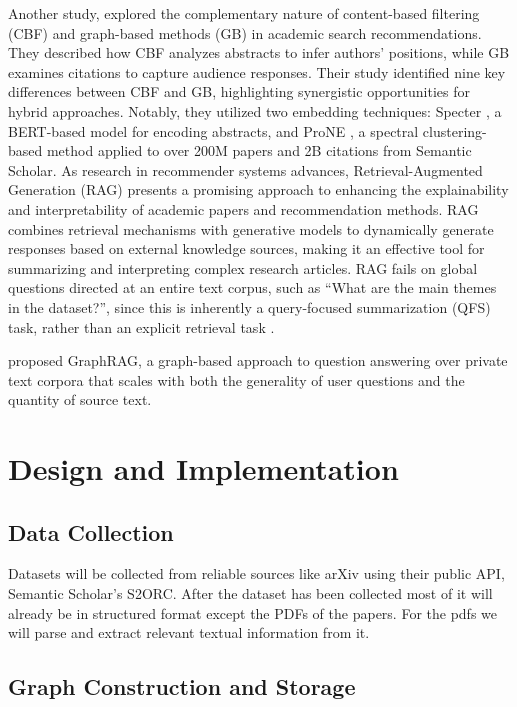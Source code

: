 \documentclass[a4paper,12pt]{article}
\begin{document}
Another study, \parencite{church2024academicarticlerecommendationusing} explored the
complementary nature of content-based filtering (CBF) and graph-based methods (GB)
in academic search recommendations. They described how CBF analyzes abstracts to
infer authors’ positions, while GB examines citations to capture audience responses.
Their study identified nine key differences between CBF and GB, highlighting
synergistic opportunities for hybrid approaches. Notably, they utilized two
embedding techniques: Specter
\parencite{cohan-etal-2020-specter}, a BERT-based model
for encoding abstracts, and ProNE \parencite{zhang2019prone}, a spectral clustering-based method applied to
over 200M papers and 2B citations from Semantic Scholar.
As research in recommender systems advances, Retrieval-Augmented Generation (RAG)
presents a promising approach to enhancing the explainability and interpretability
of academic papers and recommendation methods. RAG combines retrieval mechanisms
with generative models to dynamically generate responses based on external knowledge
sources, making it an effective tool for summarizing and interpreting complex
research articles. RAG fails on global questions directed at an entire text corpus,
such as “What are the main themes in the dataset?”, since this is inherently a
query-focused summarization (QFS) task, rather than an explicit retrieval task
\parencite{edge2025localglobalgraphrag}.

\parencite{edge2025localglobalgraphrag} proposed GraphRAG, a graph-based approach
to question answering over private text corpora that scales with both the generality
of user questions and the quantity of source text.
\newpage

\section{Design and Implementation}
\subsection{Data Collection}
Datasets will be collected from reliable sources like arXiv using their public API,
Semantic Scholar’s S2ORC. After the dataset has been collected most of it will
already be in structured format except the PDFs of the papers. For the pdfs we will
parse and extract relevant textual information from it.

\subsection{Graph Construction and Storage}
\end{document}
